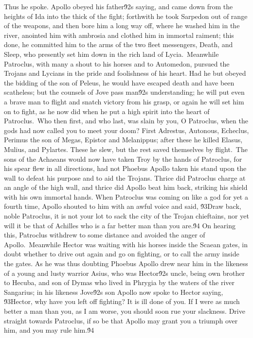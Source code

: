 {Thus he spoke. Apollo obeyed his father\'92s saying, and came down from the heights of Ida into the thick of the fight; forthwith he took Sarpedon out of range of the weapons, and then bore him a long way off, where he washed him in the river, anointed him with ambrosia and clothed him in immortal raiment; this done, he committed him to the arms of the two fleet messengers, Death, and Sleep, who presently set him down in the rich land of Lycia.\
Meanwhile Patroclus, with many a shout to his horses and to Automedon, pursued the Trojans and Lycians in the pride and foolishness of his heart. Had he but obeyed the bidding of the son of Peleus, he would have escaped death and have been scatheless; but the counsels of Jove pass man\'92s understanding; he will put even a brave man to flight and snatch victory from his grasp, or again he will set him on to fight, as he now did when he put a high spirit into the heart of Patroclus.\
Who then first, and who last, was slain by you, O Patroclus, when the gods had now called you to meet your doom? First Adrestus, Autonous, Echeclus, Perimus the son of Megas, Epistor and Melanippus; after these he killed Elasus, Mulius, and Pylartes. These he slew, but the rest saved themselves by flight.\
The sons of the Achaeans would now have taken Troy by the hands of Patroclus, for his spear flew in all directions, had not Phoebus Apollo taken his stand upon the wall to defeat his purpose and to aid the Trojans. Thrice did Patroclus charge at an angle of the high wall, and thrice did Apollo beat him back, striking his shield with his own immortal hands. When Patroclus was coming on like a god for yet a fourth time, Apollo shouted to him with an awful voice and said, \'93Draw back, noble Patroclus, it is not your lot to sack the city of the Trojan chieftains, nor yet will it be that of Achilles who is a far better man than you are.\'94 On hearing this, Patroclus withdrew to some distance and avoided the anger of Apollo.\
Meanwhile Hector was waiting with his horses inside the Scaean gates, in doubt whether to drive out again and go on fighting, or to call the army inside the gates. As he was thus doubting Phoebus Apollo drew near him in the likeness of a young and lusty warrior Asius, who was Hector\'92s uncle, being own brother to Hecuba, and son of Dymas who lived in Phrygia by the waters of the river Sangarius; in his likeness Jove\'92s son Apollo now spoke to Hector saying, \'93Hector, why have you left off fighting? It is ill done of you. If I were as much better a man than you, as I am worse, you should soon rue your slackness. Drive straight towards Patroclus, if so be that Apollo may grant you a triumph over him, and you may rule him.\'94\
}
